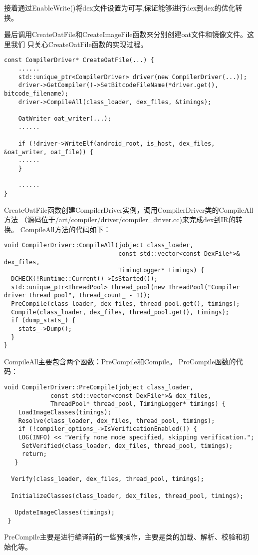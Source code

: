 接着通过EnableWrite()将dex文件设置为可写,保证能够进行dex到dex的优化转换。

最后调用CreateOatFile和CreateImageFile函数来分别创建oat文件和镜像文件。这里我们
只关心CreateOatFile函数的实现过程。
\begin{lstlisting}
const CompilerDriver* CreateOatFile(...) {
    ......
    std::unique_ptr<CompilerDriver> driver(new CompilerDriver(...));
    driver->GetCompiler()->SetBitcodeFileName(*driver.get(), bitcode_filename);
    driver->CompileAll(class_loader, dex_files, &timings);

    OatWriter oat_writer(...);
    ......

    if (!driver->WriteElf(android_root, is_host, dex_files, &oat_writer, oat_file)) {
    ......
    }

    ......
}
\end{lstlisting}
CreateOatFile函数创建CompilerDriver实例，调用CompilerDriver类的CompileAll方法
（源码位于/art/compiler/driver/compiler\_driver.cc)来完成dex到IR的转换。
CompileAll方法的代码如下：
\begin{lstlisting}
void CompilerDriver::CompileAll(jobject class_loader,
                                const std::vector<const DexFile*>& dex_files,
                                TimingLogger* timings) {
  DCHECK(!Runtime::Current()->IsStarted());
  std::unique_ptr<ThreadPool> thread_pool(new ThreadPool("Compiler driver thread pool", thread_count_ - 1));
  PreCompile(class_loader, dex_files, thread_pool.get(), timings);
  Compile(class_loader, dex_files, thread_pool.get(), timings);
  if (dump_stats_) {
    stats_->Dump();
  }
}
\end{lstlisting}
CompileAll主要包含两个函数：PreCompile和Compile。
ProCompile函数的代码：
\begin{lstlisting}
void CompilerDriver::PreCompile(jobject class_loader,
             const std::vector<const DexFile*>& dex_files,
             ThreadPool* thread_pool, TimingLogger* timings) {
    LoadImageClasses(timings);
    Resolve(class_loader, dex_files, thread_pool, timings);
    if (!compiler_options_->IsVerificationEnabled()) {
    LOG(INFO) << "Verify none mode specified, skipping verification.";
     SetVerified(class_loader, dex_files, thread_pool, timings);
     return;
   }
 
  Verify(class_loader, dex_files, thread_pool, timings);
 
  InitializeClasses(class_loader, dex_files, thread_pool, timings);
 
   UpdateImageClasses(timings);
 }

\end{lstlisting}
PreCompile主要是进行编译前的一些预操作，主要是类的加载、解析、校验和初始化等。

